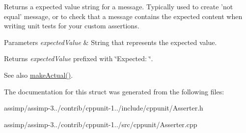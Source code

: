 Returns a expected value string for a message. Typically used to create 'not equal' message, or to check that a message contains the expected content when writing unit tests for your custom assertions. 


\begin{DoxyParams}{Parameters}
{\em expected\+Value} & String that represents the expected value. \\
\hline
\end{DoxyParams}
\begin{DoxyReturn}{Returns}
{\itshape expected\+Value} prefixed with \char`\"{}\+Expected\+: \char`\"{}. 
\end{DoxyReturn}
\begin{DoxySeeAlso}{See also}
\hyperlink{struct_asserter_acbaa32d719df8ba018024f89e1270125}{make\+Actual()}. 
\end{DoxySeeAlso}


The documentation for this struct was generated from the following files\+:\begin{DoxyCompactItemize}
\item 
assimp/assimp-\/3../contrib/cppunit-\/1../include/cppunit/Asserter.\+h\item 
assimp/assimp-\/3../contrib/cppunit-\/1../src/cppunit/Asserter.\+cpp\end{DoxyCompactItemize}
